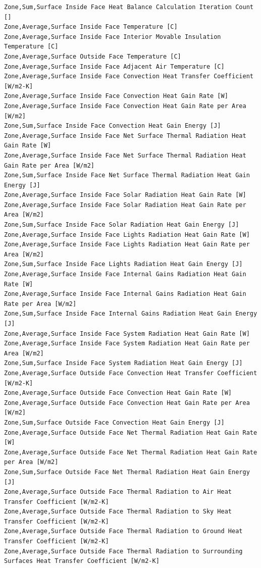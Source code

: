 \begin{lstlisting}
Zone,Sum,Surface Inside Face Heat Balance Calculation Iteration Count []
Zone,Average,Surface Inside Face Temperature [C]
Zone,Average,Surface Inside Face Interior Movable Insulation Temperature [C]
Zone,Average,Surface Outside Face Temperature [C]
Zone,Average,Surface Inside Face Adjacent Air Temperature [C]
Zone,Average,Surface Inside Face Convection Heat Transfer Coefficient [W/m2-K]
Zone,Average,Surface Inside Face Convection Heat Gain Rate [W]
Zone,Average,Surface Inside Face Convection Heat Gain Rate per Area [W/m2]
Zone,Sum,Surface Inside Face Convection Heat Gain Energy [J]
Zone,Average,Surface Inside Face Net Surface Thermal Radiation Heat Gain Rate [W]
Zone,Average,Surface Inside Face Net Surface Thermal Radiation Heat Gain Rate per Area [W/m2]
Zone,Sum,Surface Inside Face Net Surface Thermal Radiation Heat Gain Energy [J]
Zone,Average,Surface Inside Face Solar Radiation Heat Gain Rate [W]
Zone,Average,Surface Inside Face Solar Radiation Heat Gain Rate per Area [W/m2]
Zone,Sum,Surface Inside Face Solar Radiation Heat Gain Energy [J]
Zone,Average,Surface Inside Face Lights Radiation Heat Gain Rate [W]
Zone,Average,Surface Inside Face Lights Radiation Heat Gain Rate per Area [W/m2]
Zone,Sum,Surface Inside Face Lights Radiation Heat Gain Energy [J]
Zone,Average,Surface Inside Face Internal Gains Radiation Heat Gain Rate [W]
Zone,Average,Surface Inside Face Internal Gains Radiation Heat Gain Rate per Area [W/m2]
Zone,Sum,Surface Inside Face Internal Gains Radiation Heat Gain Energy [J]
Zone,Average,Surface Inside Face System Radiation Heat Gain Rate [W]
Zone,Average,Surface Inside Face System Radiation Heat Gain Rate per Area [W/m2]
Zone,Sum,Surface Inside Face System Radiation Heat Gain Energy [J]
Zone,Average,Surface Outside Face Convection Heat Transfer Coefficient [W/m2-K]
Zone,Average,Surface Outside Face Convection Heat Gain Rate [W]
Zone,Average,Surface Outside Face Convection Heat Gain Rate per Area [W/m2]
Zone,Sum,Surface Outside Face Convection Heat Gain Energy [J]
Zone,Average,Surface Outside Face Net Thermal Radiation Heat Gain Rate [W]
Zone,Average,Surface Outside Face Net Thermal Radiation Heat Gain Rate per Area [W/m2]
Zone,Sum,Surface Outside Face Net Thermal Radiation Heat Gain Energy [J]
Zone,Average,Surface Outside Face Thermal Radiation to Air Heat Transfer Coefficient [W/m2-K]
Zone,Average,Surface Outside Face Thermal Radiation to Sky Heat Transfer Coefficient [W/m2-K]
Zone,Average,Surface Outside Face Thermal Radiation to Ground Heat Transfer Coefficient [W/m2-K]
Zone,Average,Surface Outside Face Thermal Radiation to Surrounding Surfaces Heat Transfer Coefficient [W/m2-K]

\end{lstlisting}
